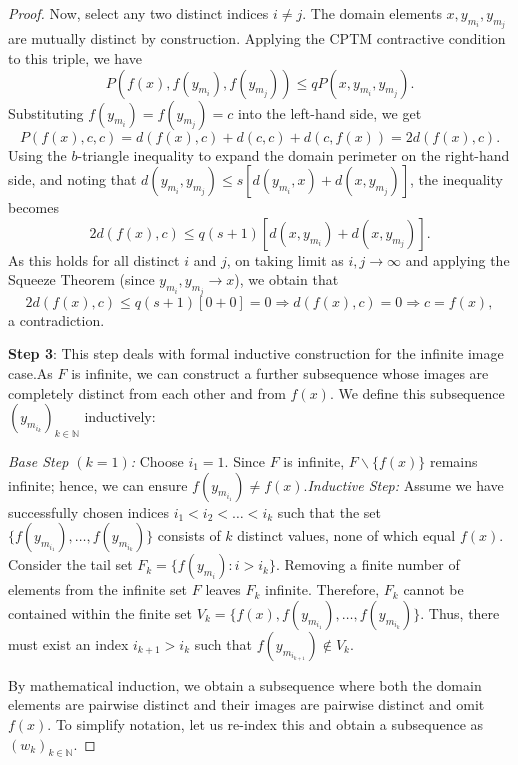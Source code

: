 \documentclass[10pt,a4paper]{amsart}
\begin{document}
\begin{proof}
Now, select any two distinct indices $i\neq j$. The domain elements $x,y_{m_i},y_{m_j}$ are mutually distinct by construction. Applying the CPTM contractive condition to this triple, we have
\[
P(f(x),f(y_{m_i}),f(y_{m_j}))\leq qP(x,y_{m_i},y_{m_j}).
\]
Substituting $f(y_{m_i}) = f(y_{m_j}) = c$ into the left-hand side, we get
\[
P(f(x),c,c) = d(f(x),c) + d(c,c) + d(c,f(x)) = 2d(f(x),c).
\]
Using the $b$-triangle inequality to expand the domain perimeter on the right-hand side, and noting that $d(y_{m_i},y_{m_j})\leq s[d(y_{m_i},x) + d(x,y_{m_j})]$, the inequality becomes
\[
2d(f(x),c)\leq q(s + 1)\left[d(x,y_{m_i}) + d(x,y_{m_j})\right].
\]
As this holds for all distinct $i$ and $j$, on taking limit as $i,j\to \infty$ and applying the Squeeze Theorem (since $y_{m_i},y_{m_j}\to x$), we obtain that
\[
2d(f(x),c)\leq q(s + 1)[0 + 0] = 0\Rightarrow d(f(x),c) = 0\Rightarrow c = f(x),
\]
a contradiction.

\textbf{Step 3}: This step deals with formal inductive construction for the infinite image case.\newline As $F$ is infinite, we can construct a further subsequence whose images are completely distinct from each other and from $f(x)$. We define this subsequence $(y_{m_{i_k}})_{k \in \mathbb{N}}$ inductively:

\textit{Base Step $(k = 1)$:} Choose $i_{1} = 1$. Since $F$ is infinite, $F\backslash \{f(x)\}$ remains infinite; hence, we can ensure $f(y_{m_{i_1}})\neq f(x)$.\newline \textit{Inductive Step:} Assume we have successfully chosen indices $i_1< i_2< \dots < i_k$ such that the set $\{f(y_{m_{i_1}}),\ldots,f(y_{m_{i_k}})\}$ consists of $k$ distinct values, none of which equal $f(x)$. Consider the tail set $F_{k} = \{f(y_{m_{i}}):i > i_{k}\}$. Removing a finite number of elements from the infinite set $F$ leaves $F_{k}$ infinite. Therefore, $F_{k}$ cannot be contained within the finite set $V_{k} = \{f(x),f(y_{m_{i_1}}),\ldots,f(y_{m_{i_k}})\}$. Thus, there must exist an index $i_{k + 1} > i_{k}$ such that $f(y_{m_{i_{k + 1}}})\notin V_{k}$.

By mathematical induction, we obtain a subsequence where both the domain elements are pairwise distinct and their images are pairwise distinct and omit $f(x)$. To simplify notation, let us re-index this and obtain a subsequence as $(w_{k})_{k \in \mathbb{N}}$.


\end{proof}
\end{document}

